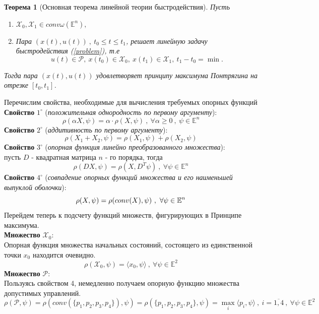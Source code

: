 \documentclass[10pt]{article}
\newtheorem{theorem}{Теорема}
\begin{document}
\begin{theorem}[Основная теорема линейной теории быстродействия]
	Пусть
	\begin{enumerate}
		\item \( \mathcal{X}_0, \mathcal{X}_1 \in conv \omega( \mathbb{E}^{n}),\)
		\item Пара \( (x(t), u(t)) \ , \ t_0 \leq t \leq t_1\), решает линейную задачу быстродействия (\ref{problem}), т.е 
		 \[ u(t) \in \mathcal{P}, \ x(t_0) \in \mathcal{X}_0, \ x(t_1) \in \mathcal{X}_1, \ t_1 - t_0 = \min. \]
	\end{enumerate}
	Тогда пара \( (x(t), u(t)) \) удовлетворяет принципу максимума Понтрягина на отрезке \( [t_0, t_1] \).
\end{theorem}

Перечислим свойства, необходимые для вычисления требуемых опорных функций\medskip\\
\textbf{Свойство} \(1^{\circ}\) (\textit{положительная однородность по первому аргументу}):
\[ \rho( \alpha X, \psi) = \alpha \cdot \rho(X, \psi) \ , \ \forall \alpha \geq 0 \ , \ \psi \in \mathbb{E}^n\]
\textbf{Свойство} \(2^{\circ}\) (\textit{аддитивность по первому аргументу}):
\[ \rho(X_1 + X_2, \psi) = \rho(X_1, \psi) + \rho(X_2, \psi)\]
\textbf{Свойство} \(3^{\circ}\) (\textit{опорная функция линейно преобразованного множества}):\\
пусть \(D\) - квадратная матрица \(n\) - го порядка, тогда
\[ \rho(DX, \psi) = \rho(X, D^T\psi) \ , \ \forall \psi \in \mathbb{E}^n\]
\textbf{Свойство} \(4^{\circ}\) (\textit{совпадение опорных функций множества и его наименьшей выпуклой оболочки}):
\[ \rho(X,\psi) = \rho(conv (X), \psi) \ , \ \forall \psi \in \mathbb{E}^n \bigskip \]
Перейдем теперь к подсчету функций множеств, фигурирующих в Принципе максимума.\medskip\\
\textbf{Множество} \( \mathcal{X}_0\):\smallskip\\
Опорная функция множества начальных состояний, состоящего из единственной точки \(x_0\) находится очевидно.
\[ \rho(\mathcal{X}_0, \psi) = \langle x_0, \psi \rangle \ , \ \forall \psi \in \mathbb{E}^2\] 
\textbf{Множество} \( \mathcal{P}\):\smallskip\\
Пользуясь свойством 4, немедленно получаем опорную функцию множества допустимых управлений.
\[ \rho(\mathcal{P}, \psi) = \rho(conv(\{p_1, p_2, p_3, p_4\}), \psi) = \rho(\{p_1, p_2, p_3, p_4\}, \psi) = \max\limits_{i} \langle p_i, \psi \rangle \ ,\ i = \overline{1, 4} \ , \ \forall \psi \in \mathbb{E}^2\] 
\end{document}
